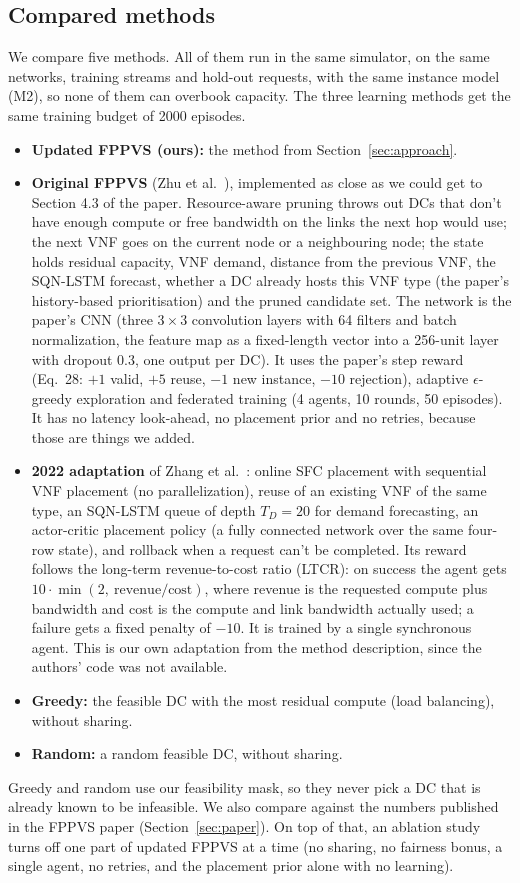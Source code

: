 \documentclass[11pt,a4paper]{article}
\begin{document}
\subsection{Compared methods}
We compare five methods. All of them run in the same simulator, on the same
networks, training streams and hold-out requests, with the same instance model
(M2), so none of them can overbook capacity. The three learning methods get the
same training budget of 2000 episodes.
\begin{itemize}
  \item \textbf{Updated FPPVS (ours):} the method from Section~\ref{sec:approach}.
  \item \textbf{Original FPPVS} (Zhu et al.~\cite{fppvs}), implemented as
  close as we could get to Section 4.3 of the paper. Resource-aware pruning
  throws out DCs that don't have enough compute or free bandwidth on the links
  the next hop would use; the next VNF goes on the current node or a
  neighbouring node; the state holds residual capacity, VNF demand, distance
  from the previous VNF, the SQN-LSTM forecast, whether a DC already hosts this
  VNF type (the paper's history-based prioritisation) and the pruned candidate
  set. The network is the paper's CNN (three $3\times3$ convolution layers with
  64 filters and batch normalization, the feature map as a fixed-length vector
  into a 256-unit layer with dropout 0.3, one output per DC). It uses the paper's
  step reward (Eq.~28: $+1$ valid, $+5$ reuse, $-1$ new instance, $-10$
  rejection), adaptive $\epsilon$-greedy exploration and federated training (4
  agents, 10 rounds, 50 episodes). It has no latency look-ahead, no placement
  prior and no retries, because those are things we added.
  \item \textbf{2022 adaptation} of Zhang et al.~\cite{zhang2022}: online SFC
  placement with sequential VNF placement (no parallelization), reuse of an
  existing VNF of the same type, an SQN-LSTM queue of depth $T_D=20$ for demand
  forecasting, an actor-critic placement policy (a fully connected network over
  the same four-row state), and rollback when a request can't be completed.
  Its reward follows the long-term revenue-to-cost ratio (LTCR): on success the
  agent gets $10\cdot\min(2,\ \text{revenue}/\text{cost})$, where revenue is
  the requested compute plus bandwidth and cost is the compute and link
  bandwidth actually used; a failure gets a fixed penalty of $-10$. It is
  trained by a single synchronous agent. This is our own adaptation from the
  method description, since the authors' code was not available.
  \item \textbf{Greedy:} the feasible DC with the most residual compute (load
  balancing), without sharing.
  \item \textbf{Random:} a random feasible DC, without sharing.
\end{itemize}
Greedy and random use our feasibility mask, so they never pick a DC that is
already known to be infeasible. We also compare against the numbers published in
the FPPVS paper (Section~\ref{sec:paper}). On top of that, an ablation study
turns off one part of updated FPPVS at a time (no sharing, no fairness bonus, a
single agent, no retries, and the placement prior alone with no learning).
\end{document}
